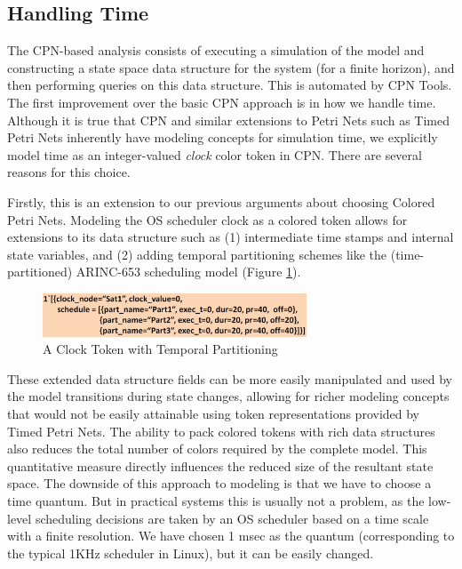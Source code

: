 \subsection{Handling Time}
\label{handling_time}

The CPN-based analysis consists of executing a simulation of the model and constructing a state space data structure for the system (for a finite horizon), and then performing queries on this data structure. This is automated by CPN Tools. The first improvement over the basic CPN approach is in how we handle time. Although it is true that CPN and similar extensions to Petri Nets such as Timed Petri Nets inherently have modeling concepts for simulation time, we explicitly model time as an integer-valued \emph{clock} color token in CPN. There are several reasons for this choice. 

Firstly, this is an extension to our previous arguments about choosing Colored Petri Nets. Modeling the OS scheduler clock as a colored token allows for extensions to its data structure such as (1) intermediate time stamps and internal state variables, and (2) adding temporal partitioning schemes like the (time-partitioned) ARINC-653 \cite{ARINC-653} scheduling model (Figure \ref{fig:clock}). 

\begin{figure}[h]
	\centering
	\includegraphics[width=0.7\textwidth]{./img/clock}
	\caption{A Clock Token with Temporal Partitioning}
	\label{fig:clock}
\end{figure}

These extended data structure fields can be more easily manipulated and used by the model transitions during state changes, allowing for richer modeling concepts that would not be easily attainable using token representations provided by Timed Petri Nets. The ability to pack colored tokens with rich data structures also reduces the total number of colors required by the complete model. This quantitative measure directly influences the reduced size of the resultant state space. The downside of this approach to modeling is that we have to choose a time quantum. But in practical systems this is usually not a problem, as the low-level scheduling decisions are taken by an OS scheduler based on a time scale with a finite resolution. We have chosen 1 msec as the quantum (corresponding to the typical 1KHz scheduler in Linux), but it can be easily changed. 

